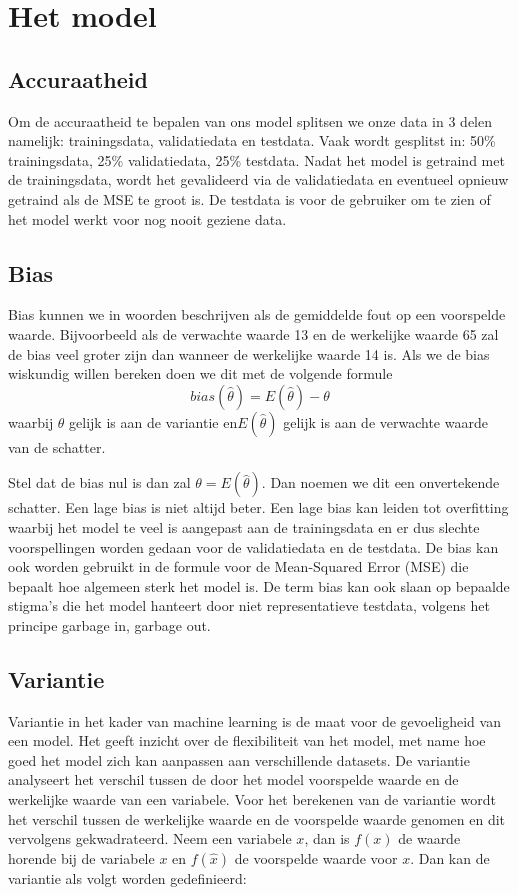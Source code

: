 \documentclass[TeamE-eindrapport]{subfiles}
\begin{document}
	
	\chapter{Het model}
	
	\section{Accuraatheid}
	
	Om de accuraatheid te bepalen van ons model splitsen we onze data in 3 delen namelijk: trainingsdata, validatiedata en testdata.
	Vaak wordt gesplitst in: 50\% trainingsdata, 25\% validatiedata, 25\% testdata. Nadat het model is getraind met de trainingsdata, wordt het gevalideerd via de validatiedata en eventueel opnieuw getraind als de MSE te groot is. De testdata is voor de gebruiker om te zien of het model werkt voor nog nooit geziene data.
	
	\section{Bias}
	
	Bias kunnen we in woorden beschrijven als de gemiddelde fout op een voorspelde waarde. Bijvoorbeeld als de
	verwachte waarde 13 en de werkelijke waarde 65 zal de bias veel groter zijn dan wanneer de werkelijke waarde 14 is.
	Als we de bias wiskundig willen bereken doen we dit met de volgende formule \[bias( \hat{\theta}) = E( \hat{\theta}) - \theta\] waarbij \(\theta\) gelijk is aan de variantie en\( E( \hat{\theta})\) gelijk is aan de verwachte waarde van de schatter.
	
	Stel dat de bias nul is dan zal \(\theta = E( \hat{\theta})\). Dan noemen we dit een onvertekende schatter. Een lage bias is niet altijd beter. Een lage bias kan leiden tot overfitting waarbij het model te veel is aangepast aan de trainingsdata en er dus slechte voorspellingen worden gedaan voor de validatiedata en de testdata. De bias kan ook worden gebruikt in de formule voor de Mean-Squared Error (MSE) die bepaalt hoe algemeen sterk het model is. De term bias kan ook slaan op bepaalde stigma's die het model hanteert door niet representatieve testdata, volgens het principe garbage in, garbage out. 
	
	\section{Variantie}
	
	Variantie in het kader van machine learning is de maat voor de gevoeligheid van een model. Het geeft inzicht over de flexibiliteit van het model, met name hoe goed het model zich kan aanpassen aan verschillende datasets. De variantie analyseert het verschil tussen de door het model voorspelde waarde en de werkelijke waarde van een variabele. Voor het berekenen van de variantie wordt het verschil tussen de werkelijke waarde en de voorspelde waarde genomen en dit vervolgens gekwadrateerd. Neem een variabele \(x\), dan is \(f(x)\) de waarde horende bij de variabele \(x\) en \(f(\hat{x})\) de voorspelde waarde voor \(x\). Dan kan de variantie als volgt worden gedefinieerd:
		
\end{document}
